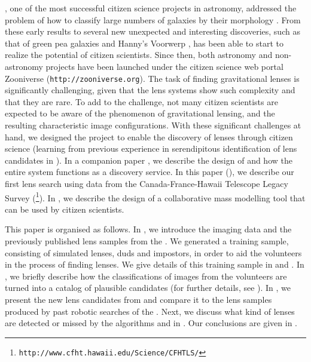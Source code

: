 \documentclass[useAMS,usenatbib,a4paper]{mn2e}
\begin{document}
\GZ, one of the most successful citizen science projects in
astronomy, addressed
the problem of how to  classify large numbers of galaxies by their
morphology \citep{Lintott2008}.
From these early results to several new unexpected and
interesting discoveries, such as that of green pea galaxies
\citep{Cardamone2009,Jaskot2013} and Hanny's Voorwerp
\citep{Lintott2009,Keel2012}, \GZ has been able to start to realize the potential
of citizen scientists.  Since then, both astronomy and non-astronomy projects
have been launched under the citizen science web portal Zooniverse
(\texttt{http://zooniverse.org}). The task of finding gravitational lenses is
significantly challenging, given that the lens systems show such
complexity and that they are rare. To add to the challenge, not many
citizen scientists are expected to be aware of the phenomenon of
gravitational lensing, and the resulting characteristic image configurations.  With
these significant challenges at hand, we designed the \sw project to
enable the discovery of lenses through citizen science (learning from
previous experience in serendipitous identification of lens candidates in \GZ).
In a companion
paper \citep[][hereafter \PaperOne]{Marshall2015}, we describe the design of
\sw and how the entire system functions as a discovery service.  In this
paper (\PaperTwo), we describe our first lens search using data
from the Canada-France-Hawaii Telescope Legacy Survey
(\cfhtls\footnote{\texttt{http://www.cfht.hawaii.edu/Science/CFHTLS/}}).
In \citet{Kung2015}, we describe the design of a collaborative
mass modelling tool that can be used by citizen scientists.

This paper is organised as follows. In
, we introduce the \cfhtls imaging data and the
previously published lens samples from the \cfhtls. We generated a training sample,
consisting of simulated lenses, duds and impostors, in order to
aid the \sw volunteers in the process of finding lenses. We give details of this
training sample in  and . In ,
we briefly describe how the classifications of images from the volunteers are
turned into a catalog of plausible candidates (for further details, see
\PaperOne). In , we present the new lens candidates from \sw and
compare it to the lens samples produced by past robotic searches of
the \cfhtls. Next, we discuss what kind of lenses are detected
or missed by the algorithms and \sw in .
Our conclusions are given in .


\end{document}
